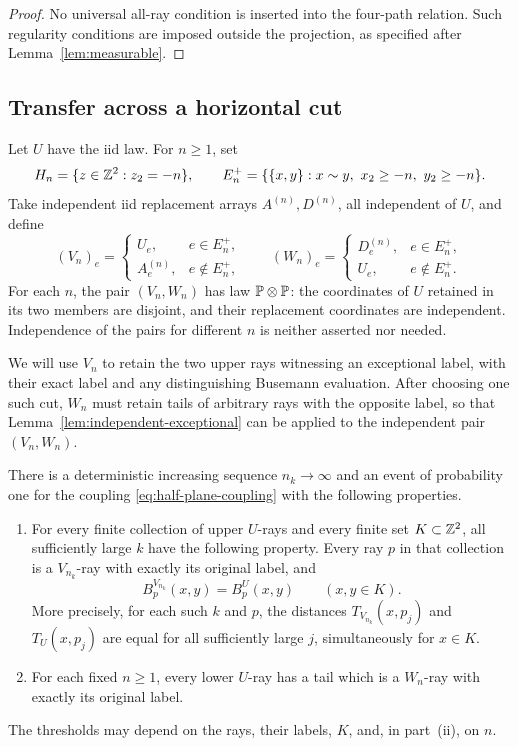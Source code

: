 \begin{proof}
No universal all-ray condition is inserted into the four-path
relation. Such regularity conditions are imposed outside the
projection, as specified after Lemma~\ref{lem:measurable}.
\end{proof}

\subsection{Transfer across a horizontal cut}

Let $U$ have the iid law.  For $n\ge1$, set
\[
 H_n=\{z\in\mathbb Z^2:z_2=-n\},\qquad
 E_n^+=\{\{x,y\}:x\sim y,\ x_2\ge-n,\ y_2\ge-n\}.
\]
Take independent iid replacement arrays $A^{(n)},D^{(n)}$, all
independent of $U$, and define
\begin{equation}
 (V_n)_e=
 \begin{cases}U_e,&e\in E_n^+,\\ A^{(n)}_e,&e\notin E_n^+,\end{cases}
 \qquad
 (W_n)_e=
 \begin{cases}D^{(n)}_e,&e\in E_n^+,\\ U_e,&e\notin E_n^+.\end{cases}
 \label{eq:half-plane-coupling}
\end{equation}
For each $n$, the pair $(V_n,W_n)$ has law $\mathbb P\otimes\mathbb P$: the
coordinates of $U$ retained in its two members are disjoint, and
their replacement coordinates are independent.  Independence of
the pairs for different $n$ is neither asserted nor needed.

We will use $V_n$ to retain the two upper rays witnessing an exceptional
label, with their exact label and any distinguishing Busemann evaluation.
After choosing one such cut, $W_n$ must retain tails of arbitrary rays
with the opposite label, so that Lemma~\ref{lem:independent-exceptional}
can be applied to the independent pair $(V_n,W_n)$.

\begin{lemma}
\label{lem:cut-transfer}
There is a deterministic increasing sequence $n_k\to\infty$ and an
event of probability one for the coupling
\eqref{eq:half-plane-coupling} with the following properties.
\begin{enumerate}[label=(\roman*)]
\item For every finite collection of upper $U$-rays and every finite
      set $K\subset\mathbb Z^2$, all sufficiently large $k$ have the
      following property.  Every ray $p$ in that collection is a
      $V_{n_k}$-ray with exactly its original label, and
      \[
       B_p^{V_{n_k}}(x,y)=B_p^U(x,y)\qquad(x,y\in K).
      \]
      More precisely, for each such $k$ and $p$, the distances
      $T_{V_{n_k}}(x,p_j)$ and $T_U(x,p_j)$ are equal for all
      sufficiently large $j$, simultaneously for $x\in K$.
\item For each fixed $n\ge1$, every lower $U$-ray has a tail which
      is a $W_n$-ray with exactly its original label.
\end{enumerate}
The thresholds may depend on the rays, their labels, $K$, and, in
part~(ii), on $n$.
\end{lemma}

